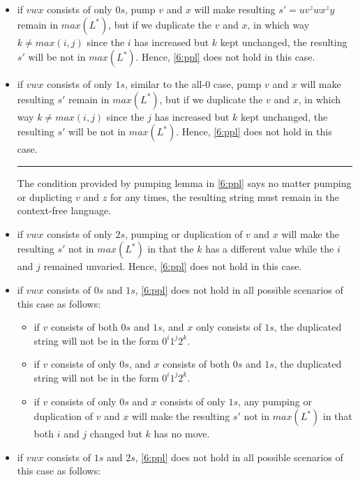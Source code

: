 \documentclass[11pt,a4paper]{article}
\newcommand{\LL}{L^{*}}
\begin{document}
\begin{itemize}
    \item{if $vwx$ consists of only $0s$, pump $v$ and $x$ will make resulting $s'=uv^{z}wx^{z}y$ remain in $max(\LL)$, but if we duplicate the $v$ and $x$, in which way $k \neq max(i,j) $ since the $i$ has increased but $k$ kept unchanged, the resulting $s'$ will be not in $max(\LL)$. Hence, \eqref{6:ppl} does not hold in this case.} 
    \item{if $vwx$ consists of only $1s$, similar to the all-0 case, pump $v$ and $x$ will make resulting $s'$ remain in $max(\LL)$, but if we duplicate the $v$ and $x$, in which way $k \neq max(i,j) $ since the $j$ has increased but $k$ kept unchanged, the resulting $s'$ will be not in $max(\LL)$. Hence, \eqref{6:ppl} does not hold in this case.} \\
\vfill 
\hrule
{
\footnotesize The condition provided by pumping lemma in \eqref{6:ppl} says no matter pumping or duplicting $v$ and $z$ for any times, the resulting string must remain in the context-free language.
}
    \item{if $vwx$ consists of only $2s$, pumping or duplication of $v$ and $x$ will make the resulting $s'$ not in $max(\LL)$ in that the $k$ has a different value while the $i$ and $j$ remained unvaried.  Hence, \eqref{6:ppl} does not hold in this case.}
\item{if $vwx$ consists of $0s$ and $1s$, \eqref{6:ppl} does not hold in all possible scenarios of this case as follows:}
    \begin{itemize} \renewcommand{\labelitemii}{$\diamond$}
        \item{if $v$ consists of both $0s$ and $1s$, and $x$ only consists of $1s$, the duplicated string will not be in the form $0^{i}1^{j}2^{k}$.}
        \item{if $v$ consists of only $0s$, and $x$ consists of both $0s$ and $1s$, the duplicated string will not be in the form $0^{i}1^{j}2^{k}$.}
        \item{if $v$ consists of only $0s$ and $x$ consists of only $1s$, any pumping or duplication of $v$ and $x$ will make the resulting $s'$ not in $max(\LL)$ in that both $i$ and $j$ changed but $k$ has no move.}
    \end{itemize}   
    \item{if $vwx$ consists of $1s$ and $2s$, \eqref{6:ppl} does not hold in all possible scenarios of this case as follows:}
    \begin{itemize} \renewcommand{\labelitemii}{$\diamond$}

\end{itemize}
\end{itemize}
\end{document}
